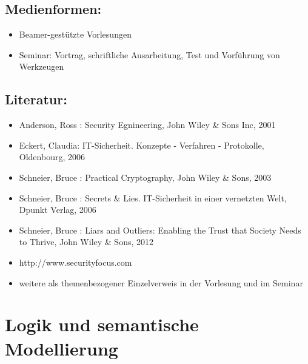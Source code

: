 \section*{Medienformen:\label{/mi-2017/modulbeschreibungen-master/MA_WTW_Modul_IT-Sicherheit}}\label{medienformenpathlabelmi-2017modulbeschreibungen-mastermaux5fwtwux5fmodulux5fit-sicherheit}

\begin{itemize}
\tightlist
\item
  Beamer-gestützte Vorlesungen
\item
  Seminar: Vortrag, schriftliche Ausarbeitung, Test und Vorführung von
  Werkzeugen
\end{itemize}

\section*{Literatur:\label{/mi-2017/modulbeschreibungen-master/MA_WTW_Modul_IT-Sicherheit}}\label{literaturpathlabelmi-2017modulbeschreibungen-mastermaux5fwtwux5fmodulux5fit-sicherheit}

\begin{itemize}
\tightlist
\item
  Anderson, Ross : Security Egnineering, John Wiley \& Sons Inc, 2001
\item
  Eckert, Claudia: IT-Sicherheit. Konzepte - Verfahren - Protokolle,
  Oldenbourg, 2006
\item
  Schneier, Bruce : Practical Cryptography, John Wiley \& Sons, 2003
\item
  Schneier, Bruce : Secrets \& Lies. IT-Sicherheit in einer vernetzten
  Welt, Dpunkt Verlag, 2006
\item
  Schneier, Bruce : Liars and Outliers: Enabling the Trust that Society
  Needs to Thrive, John Wiley \& Sons, 2012
\item
  http://www.securityfocus.com
\item
  weitere als themenbezogener Einzelverweis in der Vorlesung und im
  Seminar
\end{itemize}

\chapter{Logik und semantische
Modellierung\label{/mi-2017/modulbeschreibungen-master/MA_WTW_Modul_Logik-und-semantische-Modellierung}}\label{logik-und-semantische-modellierungpathlabelmi-2017modulbeschreibungen-mastermaux5fwtwux5fmodulux5flogik-und-semantische-modellierung}

